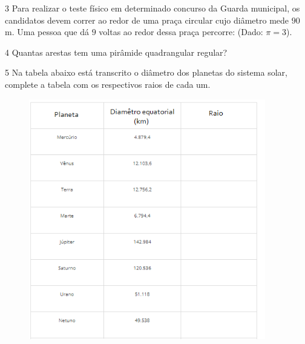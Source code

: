 {


\num{3}  Para realizar o teste físico em determinado concurso da Guarda
municipal, os candidatos devem correr ao redor de uma praça circular
cujo diâmetro mede $90$ m. Uma pessoa que dá $9$ voltas ao redor dessa praça
percorre: (Dado: $π = 3$).


\num{4}  Quantas arestas tem uma pirâmide quadrangular regular?


\num{5}  Na tabela abaixo está transcrito o diâmetro dos planetas do sistema
solar, complete a tabela com os respectivos raios de cada um.

\begin{figure}
\includegraphics[width=4.05833in,height=4.13212in]{./imgSAEB_6_MAT/media/image48.png}
\end{figure}

}
